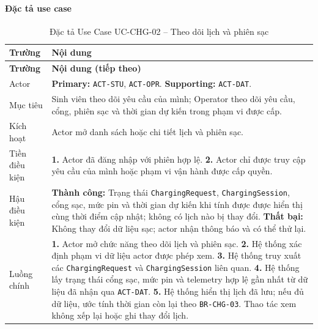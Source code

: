 \paragraph{Đặc tả use case}
\small
\begin{longtable}{|L{26mm}|L{118mm}|}
  \caption{Đặc tả Use Case UC-CHG-02 -- Theo dõi lịch và phiên sạc}\label{tab:spec-UC-CHG-02}\\
  \hline
  \centering\arraybackslash\textbf{Trường} & \centering\arraybackslash\textbf{Nội dung}\\
  \hline
  \endfirsthead
  \hline
  \centering\arraybackslash\textbf{Trường} & \centering\arraybackslash\textbf{Nội dung (tiếp theo)}\\
  \hline
  \endhead
  Actor & \textbf{Primary:} \texttt{ACT-STU}, \texttt{ACT-OPR}. \textbf{Supporting:} \texttt{ACT-DAT}.\\\hline
  Mục tiêu & Sinh viên theo dõi yêu cầu của mình; Operator theo dõi yêu cầu, cổng, phiên sạc và thời gian dự kiến trong phạm vi được cấp.\\\hline
  Kích hoạt & Actor mở danh sách hoặc chi tiết lịch và phiên sạc.\\\hline
  Tiền điều kiện &
    \textbf{1.} Actor đã đăng nhập với phiên hợp lệ.\newline
    \textbf{2.} Actor chỉ được truy cập yêu cầu của mình hoặc phạm vi vận hành được cấp quyền.\\\hline
  Hậu điều kiện &
    \textbf{Thành công:} Trạng thái \texttt{ChargingRequest}, \texttt{ChargingSession}, cổng sạc, mức pin và thời gian dự kiến khi tính được được hiển thị cùng thời điểm cập nhật; không có lịch nào bị thay đổi.\newline
    \textbf{Thất bại:} Không thay đổi dữ liệu sạc; actor nhận thông báo và có thể thử lại.\\\hline
  Luồng chính &
    \textbf{1.} Actor mở chức năng theo dõi lịch và phiên sạc.\newline
    \textbf{2.} Hệ thống xác định phạm vi dữ liệu actor được phép xem.\newline
    \textbf{3.} Hệ thống truy xuất các \texttt{ChargingRequest} và \texttt{ChargingSession} liên quan.\newline
    \textbf{4.} Hệ thống lấy trạng thái cổng sạc, mức pin và telemetry hợp lệ gần nhất từ dữ liệu đã nhận qua \texttt{ACT-DAT}.\newline
    \textbf{5.} Hệ thống hiển thị lịch đã lưu; nếu đủ dữ liệu, ước tính thời gian còn lại theo \texttt{BR-CHG-03}. Thao tác xem không xếp lại hoặc ghi thay đổi lịch.\newline

\end{longtable}
